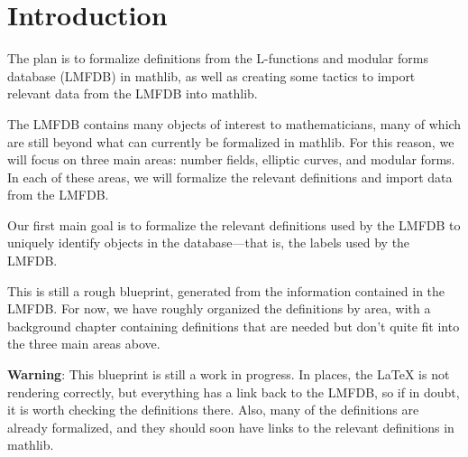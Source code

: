 %

\tableofcontents

\chapter{Introduction}

The plan is to formalize definitions from the L-functions and modular forms database (LMFDB) in mathlib, as well as creating some tactics to import relevant data from the LMFDB into mathlib.

The LMFDB contains many objects of interest to mathematicians, many of which are still beyond what can currently be formalized in mathlib. For this reason, we will focus on three main areas: number fields, elliptic curves, and modular forms. In each of these areas, we will formalize the relevant definitions and import data from the LMFDB.

Our first main goal is to formalize the relevant definitions used by the LMFDB to uniquely identify objects in the database—that is, the labels used by the LMFDB.

This is still a rough blueprint, generated from the information contained in the LMFDB. For now, we have roughly organized the definitions by area, with a background chapter containing definitions that are needed but don't quite fit into the three main areas above.

\textbf{Warning}: This blueprint is still a work in progress. In places, the LaTeX is not rendering correctly, but everything has a link back to the LMFDB, so if in doubt, it is worth checking the definitions there. Also, many of the definitions are already formalized, and they should soon have links to the relevant definitions in mathlib.





